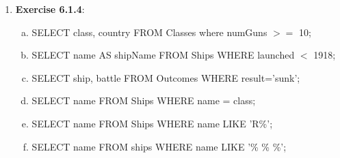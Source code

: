 \documentclass[12pt]{article}
\begin{document}
\begin{enumerate}[1.]
    \item \textbf{Exercise 6.1.4}:

    \begin{enumerate}[a)]
        \item SELECT class, country FROM Classes where numGuns $>=$ 10;
        \item SELECT name AS shipName FROM Ships WHERE launched $<$ 1918;
        \item SELECT ship, battle FROM Outcomes WHERE result='sunk';
        \item SELECT name FROM Ships WHERE name = class;
        \item SELECT name FROM Ships WHERE name LIKE 'R\%';
        \item SELECT name FROM ships WHERE name LIKE '\% \% \%';
    \end{enumerate}
\end{enumerate}
\end{document}
